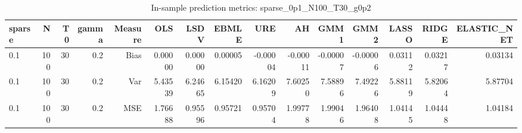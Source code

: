 \begin{table}[!htbp]\centering
\caption{In-sample prediction metrics: sparse_0p1_N100_T30_g0p2}
\label{tab:table2_sparse_0p1_N100_T30_g0p2}
\begin{tabular}{lrrrrrrrrrrrrrr}
\hline
sparse & N & T0 & gamma & Measure & OLS & LSDV & EBMLE & URE & AH & GMM1 & GMM2 & LASSO & RIDGE & ELASTIC_NET \\
\hline
0.1 & 100 & 30 & 0.2 & Bias & 0.00000 & 0.00000 & 0.00005 & -0.00004 & -0.00011 & -0.00007 & -0.00006 & 0.03112 & 0.03217 & 0.03134 \\
0.1 & 100 & 30 & 0.2 & Var & 5.43539 & 6.24665 & 6.15420 & 6.16209 & 7.60250 & 7.58896 & 7.49226 & 5.88119 & 5.82064 & 5.87704 \\
0.1 & 100 & 30 & 0.2 & MSE & 1.76688 & 0.95596 & 0.95721 & 0.95704 & 1.99778 & 1.99046 & 1.96408 & 1.04145 & 1.04448 & 1.04184 \\
\hline
\end{tabular}
\end{table}

